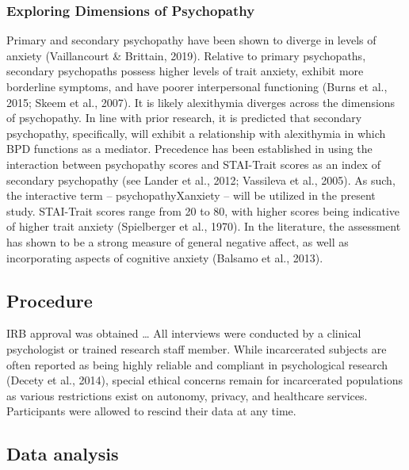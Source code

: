 \documentclass[
  man,floatsintext]{apa7}
\begin{document}
\hypertarget{exploring-dimensions-of-psychopathy}{%
\subsubsection{Exploring Dimensions of Psychopathy}\label{exploring-dimensions-of-psychopathy}}

Primary and secondary psychopathy have been shown to diverge in levels of anxiety (Vaillancourt \& Brittain, 2019). Relative to primary psychopaths, secondary psychopaths possess higher levels of trait anxiety, exhibit more borderline symptoms, and have poorer interpersonal functioning (Burns et al., 2015; Skeem et al., 2007). It is likely alexithymia diverges across the dimensions of psychopathy. In line with prior research, it is predicted that secondary psychopathy, specifically, will exhibit a relationship with alexithymia in which BPD functions as a mediator. Precedence has been established in using the interaction between psychopathy scores and STAI-Trait scores as an index of secondary psychopathy (see Lander et al., 2012; Vassileva et al., 2005). As such, the interactive term -- psychopathyXanxiety -- will be utilized in the present study. STAI-Trait scores range from 20 to 80, with higher scores being indicative of higher trait anxiety (Spielberger et al., 1970). In the literature, the assessment has shown to be a strong measure of general negative affect, as well as incorporating aspects of cognitive anxiety (Balsamo et al., 2013).

\hypertarget{procedure}{%
\subsection{Procedure}\label{procedure}}

IRB approval was obtained \ldots{} All interviews were conducted by a clinical psychologist or trained research staff member. While incarcerated subjects are often reported as being highly reliable and compliant in psychological research (Decety et al., 2014), special ethical concerns remain for incarcerated populations as various restrictions exist on autonomy, privacy, and healthcare services. Participants were allowed to rescind their data at any time.

\hypertarget{data-analysis}{%
\subsection{Data analysis}\label{data-analysis}}
\end{document}
